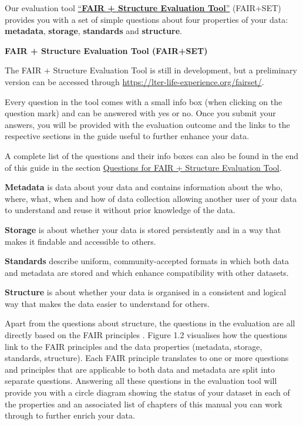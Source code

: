 \documentclass[
  oneside]{book}
\begin{document}
Our evaluation tool \href{https://lter-life-experience.org/fairset/}{``\textbf{FAIR + Structure Evaluation Tool}''} (FAIR+SET) provides you with a set of simple questions about four properties of your data: \textbf{metadata}, \textbf{storage}, \textbf{standards} and \textbf{structure}.

\begin{infobox}

{\textbf{FAIR + Structure Evaluation Tool (FAIR+SET)}}

The FAIR + Structure Evaluation Tool is still in development, but a preliminary version can be accessed through \url{https://lter-life-experience.org/fairset/}.

Every question in the tool comes with a small info box (when clicking on the question mark) and can be answered with yes or no. Once you submit your answers, you will be provided with the evaluation outcome and the links to the respective sections in the guide useful to further enhance your data.

A complete list of the questions and their info boxes can also be found in the end of this guide in the section \hyperref[questions-tool]{Questions for FAIR + Structure Evaluation Tool}.

\end{infobox}

\textbf{Metadata} is data about your data and contains information about the who, where, what, when and how of data collection allowing another user of your data to understand and reuse it without prior knowledge of the data.

\textbf{Storage} is about whether your data is stored persistently and in a way that makes it findable and accessible to others.

\textbf{Standards} describe uniform, community-accepted formats in which both data and metadata are stored and which enhance compatibility with other datasets.

\textbf{Structure} is about whether your data is organised in a consistent and logical way that makes the data easier to understand for others.

Apart from the questions about structure, the questions in the evaluation are all directly based on the FAIR principles \autocite{Wilkinson_2016}. Figure 1.2 visualises how the questions link to the FAIR principles and the data properties (metadata, storage, standards, structure). Each FAIR principle translates to one or more questions and principles that are applicable to both data and metadata are split into separate questions. Answering all these questions in the evaluation tool will provide you with a circle diagram showing the status of your dataset in each of the properties and an associated list of chapters of this manual you can work through to further enrich your data.
\end{document}
